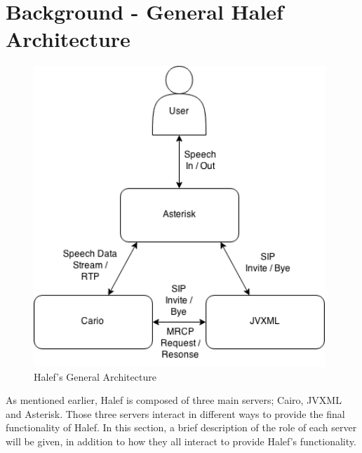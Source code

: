 \section{Background - General Halef Architecture}
\begin{figure}[h]
  \centering
  \includegraphics[width=11cm]{resources/images/Halef-General.png}
  \caption{Halef's General Architecture}
  \label{fig:halefgeneral}
\end{figure}

As mentioned earlier, Halef is composed of three main servers; Cairo, JVXML and Asterisk.
Those three servers interact in different ways to provide the final functionality of Halef.
In this section, a brief description of the role of each server will be given, in addition to how they all interact to provide Halef's functionality.

